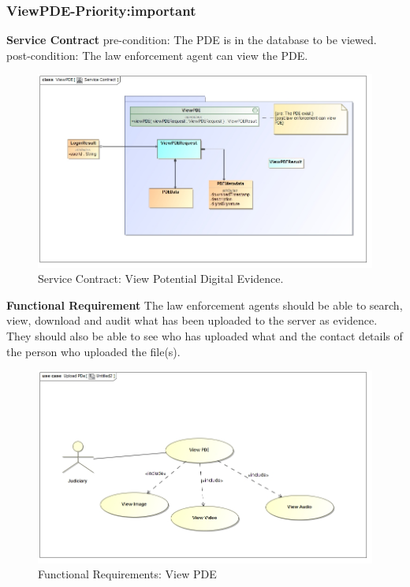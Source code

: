 \documentclass[a4paper,12pt]{article}
\begin{document}
\subsubsection{ViewPDE-Priority:important}
\textbf{Service Contract}\newline
pre-condition: The PDE is in the database to be viewed.\newline
post-condition: The law enforcement agent can view the PDE.\newline
\begin{figure}[H]
\includegraphics[width=\textwidth]{images/viewServiceContract.jpg}
\caption{Service Contract: View Potential Digital Evidence.\label{overflow}}
\end{figure}\newpage
\textbf{Functional Requirement}\newline
The law enforcement agents should be able to search, view, download and audit what has been uploaded to the server as evidence. They should also be able to see who has uploaded what and the contact details of the person who uploaded the file(s).\newline

\begin{figure}[H]
\includegraphics[width=\textwidth]{images/view.jpg}
\caption{Functional Requirements: View PDE\label{overflow}}
\end{figure}
\newpage
\end{document}
